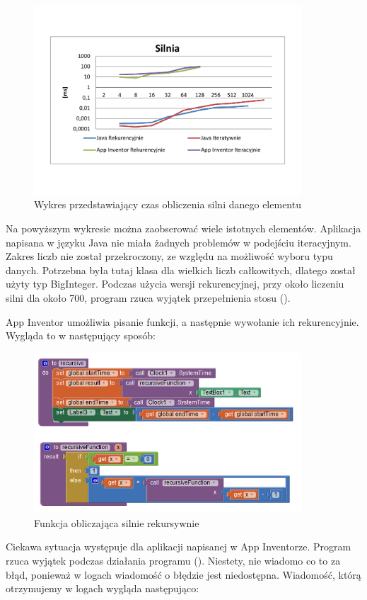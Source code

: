 \begin{figure}[H]
\centering\includegraphics[width=10cm]{figures/apps/factorialChart}
\caption{Wykres przedstawiający czas obliczenia silni danego elementu}
\end{figure}

Na powyższym wykresie można zaobserować wiele istotnych elementów. Aplikacja napisana w języku Java nie miała żadnych problemów w podejściu iteracyjnym. Zakres liczb nie został przekroczony, ze względu na możliwość wyboru typu danych. Potrzebna była tutaj klasa dla wielkich liczb całkowitych, dlatego został użyty typ BigInteger. Podczas użycia wersji rekurencyjnej, przy około liczeniu silni dla około 700, program rzuca wyjątek przepełnienia stosu ().

App Inventor umożliwia pisanie funkcji, a następnie wywołanie ich rekurencyjnie. Wygląda to w następujący sposób:

\begin{figure}[H]
\centering\includegraphics[width=10cm]{figures/apps/recursiveFunction}
\caption{Funkcja obliczająca silnie rekursywnie}
\end{figure}

Ciekawa sytuacja występuje dla aplikacji napisanej w App Inventorze. Program rzuca wyjątek podczas działania programu (). Niestety, nie wiadomo co to za błąd, ponieważ w logach wiadomość o błędzie jest niedostępna. Wiadomość, którą otrzymujemy w logach wygląda następująco:

